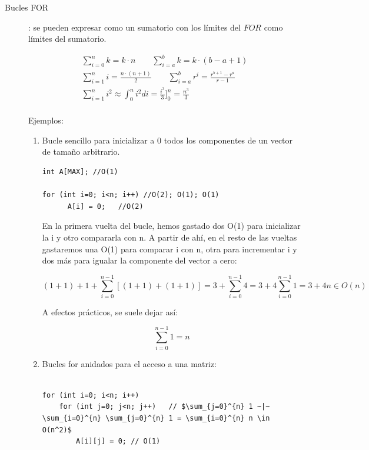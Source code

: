 \documentclass[10pt,a4paper,spanish]{report}
\theoremstyle{definition}
\theoremstyle{remark}
\begin{document}
    \begin{description}
        \item [Bucles FOR]: se pueden expresar como un sumatorio con los límites del $FOR$ como límites del sumatorio.

        \begin{align*}
            \sum_{i=0}^{n} k = k\cdot n \qquad
            \sum_{i=a}^{b} k = k\cdot(b-a+1)\\
            \sum_{i=1}^{n} i = \frac{n\cdot(n+1)}{2} \qquad
            \sum_{i=a}^{b} r^i = \frac{r^{b+1}-r^a}{r-1}\\
            \sum_{i=1}^{n} i^2 \approx \int_{0}^{n} i^2 di = \frac{i^3}{3} ]_{0}^{n} = \frac{n^3}{3}\\
        \end{align*}

        Ejemplos:

        \begin{enumerate}
            \item Bucle sencillo para inicializar a 0 todos los componentes de un vector de tamaño arbitrario.

\begin{verbatim}
int A[MAX]; //O(1)

for (int i=0; i<n; i++) //O(2); O(1); O(1)
      A[i] = 0;   //O(2)
\end{verbatim}
        En la primera vuelta del bucle, hemos gastado dos O(1) para inicializar la i y otro compararla con n. A partir de ahí, en el resto de las vueltas gastaremos una O(1) para comparar i con n, otra para incrementar i y dos más para igualar la componente del vector a cero:

\begin{displaymath}
(1+1) + 1 + \sum_{i=0}^{n-1}[(1+1) + (1+1)] = 3 + \sum_{i=0}^{n-1}4 = 3 + 4 \sum_{i=0}^{n-1}1 = 3 + 4n \in O(n)
\end{displaymath}

        A efectos prácticos, se suele dejar así:

\begin{displaymath}
\sum_{i=0}^{n-1} 1 = n
\end{displaymath}
        
        \item Bucles for anidados para el acceso a una matriz:

\begin{verbatim}

for (int i=0; i<n; i++) 
    for (int j=0; j<n; j++)   // $\sum_{j=0}^{n} 1 ~|~ \sum_{i=0}^{n} \sum_{j=0}^{n} 1 = \sum_{i=0}^{n} n \in O(n^2)$
        A[i][j] = 0; // O(1)          
\end{verbatim}


\end{enumerate}
\end{description}
\end{document}
